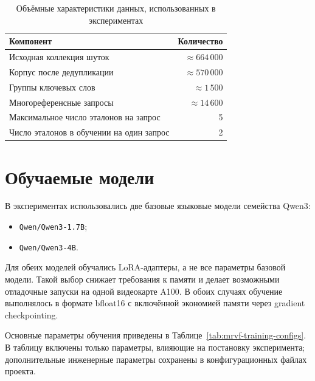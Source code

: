 \begin{table}[h]
    \centering
    \caption{Объёмные характеристики данных, использованных в экспериментах}
    \label{tab:experiment-data}
    \begin{tabular}{lr}
        \hline
        Компонент                                & Количество           \\
        \hline
        Исходная коллекция шуток                 & \(\approx 664\,000\) \\
        Корпус после дедупликации                & \(\approx 570\,000\) \\
        Группы ключевых слов                     & \(\approx 1\,500\)   \\
        Многореференсные запросы                 & \(\approx 14\,600\)  \\
        Максимальное число эталонов на запрос    & 5                    \\
        Число эталонов в обучении на один запрос & 2                    \\
        \hline
    \end{tabular}
\end{table}

\section{Обучаемые модели}

В экспериментах использовались две базовые языковые модели семейства Qwen3:
\begin{itemize}
    \item \texttt{Qwen/Qwen3-1.7B};
    \item \texttt{Qwen/Qwen3-4B}.
\end{itemize}

Для обеих моделей обучались LoRA-адаптеры, а не все параметры базовой модели. Такой выбор снижает требования к памяти и делает возможными отладочные запуски на одной видеокарте A100. В обоих случаях обучение выполнялось в формате bfloat16 с включённой экономией памяти через gradient checkpointing.

Основные параметры обучения приведены в Таблице~\ref{tab:mrvf-training-configs}. В таблицу включены только параметры, влияющие на постановку эксперимента; дополнительные инженерные параметры сохранены в конфигурационных файлах проекта.


